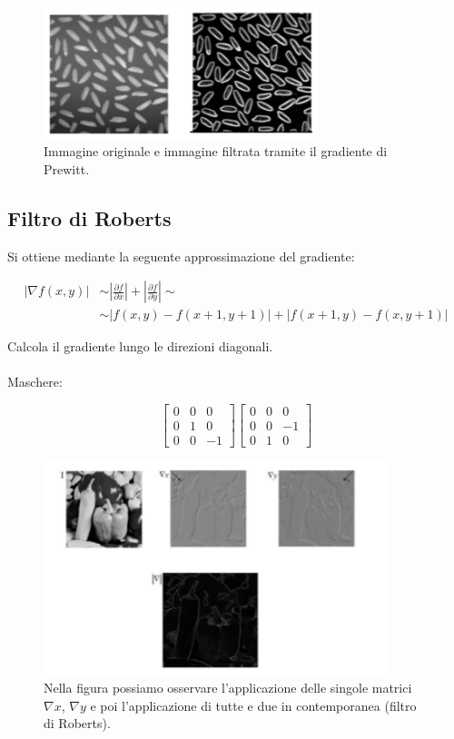 \begin{figure}[H]
    \centering
    \includegraphics[width=8cm, keepaspectratio]{capitoli/immagini/imgs/prewitt.png}
    \caption{Immagine originale e immagine filtrata tramite il gradiente
        di Prewitt.}
\end{figure}

\subsection{Filtro di Roberts}
Si ottiene mediante la seguente approssimazione del gradiente:

\begin{align*}
    |\nabla f(x,y)| & \sim |\frac{\partial{f}}{\partial{x}}| + |\frac{\partial{f}}{\partial{y}}| \sim \\
                    & \sim |f(x,y) - f(x+1, y+1)| + |f(x+1, y) - f(x,y+1)|
\end{align*}

Calcola il gradiente lungo le direzioni diagonali.
\\\\
Maschere:

\begin{center}
    \[
        \begin{bmatrix}
            0 & 0 & 0  \\
            0 & 1 & 0  \\
            0 & 0 & -1
        \end{bmatrix}
        \begin{bmatrix}
            0 & 0 & 0  \\
            0 & 0 & -1 \\
            0 & 1 & 0
        \end{bmatrix}
    \]
\end{center}

\begin{figure}[H]
    \centering
    \includegraphics[width=10cm, keepaspectratio]{capitoli/immagini/imgs/roberts.png}
    \caption{Nella figura possiamo osservare l'applicazione delle singole matrici $\nabla x$, $\nabla y$ e poi l'applicazione di tutte e due in contemporanea (filtro di Roberts).}
\end{figure}


